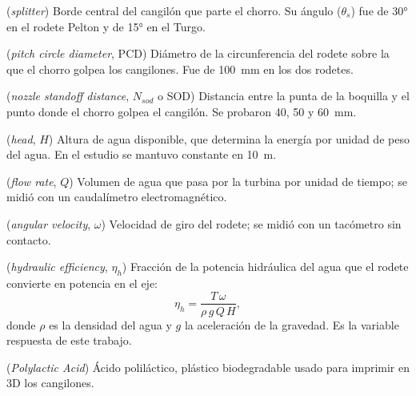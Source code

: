 \begin{description}[style=nextline, leftmargin=1.2em, itemsep=3pt, font=\normalfont\bfseries\color{verdeOscuroUN}]
\item[Arista divisoria] (\textit{splitter}) Borde central del cangilón que parte el chorro. Su ángulo ($\theta_s$) fue de 30° en el rodete Pelton y de 15° en el Turgo.

\item[Diámetro primitivo] (\textit{pitch circle diameter}, PCD) Diámetro de la circunferencia del rodete sobre la que el chorro golpea los cangilones. Fue de 100~mm en los dos rodetes.

\item[Distancia boquilla-rodete] (\textit{nozzle standoff distance}, $N_{sod}$ o SOD) Distancia entre la punta de la boquilla y el punto donde el chorro golpea el cangilón. Se probaron 40, 50 y 60~mm.

\item[Caída o cabeza] (\textit{head}, $H$) Altura de agua disponible, que determina la energía por unidad de peso del agua. En el estudio se mantuvo constante en 10~m.

\item[Caudal] (\textit{flow rate}, $Q$) Volumen de agua que pasa por la turbina por unidad de tiempo; se midió con un caudalímetro electromagnético.

\item[Velocidad angular] (\textit{angular velocity}, $\omega$) Velocidad de giro del rodete; se midió con un tacómetro sin contacto.

\item[Eficiencia hidráulica] (\textit{hydraulic efficiency}, $\eta_h$) Fracción de la potencia hidráulica del agua que el rodete convierte en potencia en el eje:
\[
\eta_h = \frac{T\,\omega}{\rho\, g\, Q\, H},
\]
donde $\rho$ es la densidad del agua y $g$ la aceleración de la gravedad. Es la variable respuesta de este trabajo.

\item[PLA] (\textit{Polylactic Acid}) Ácido poliláctico, plástico biodegradable usado para imprimir en 3D los cangilones.

\end{description}

